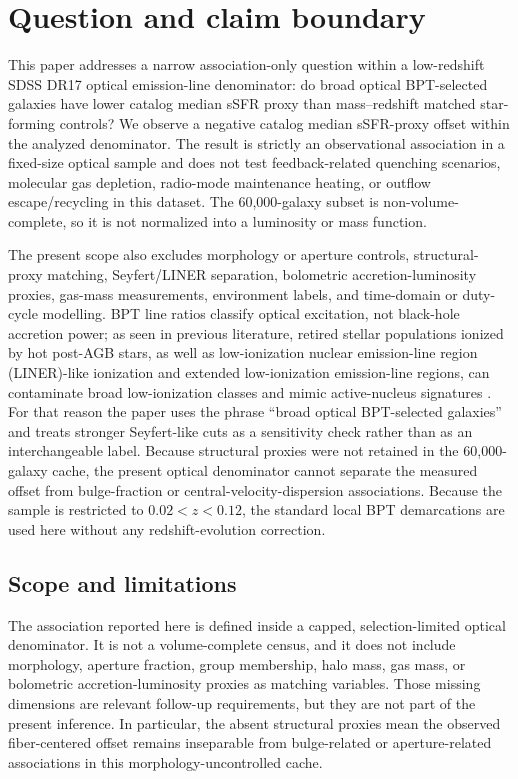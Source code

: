\documentclass[twocolumn]{aastex631}
\begin{document}

\section{Question and claim boundary}
This paper addresses a narrow association-only question within a low-redshift SDSS DR17 optical emission-line denominator: do broad optical BPT-selected galaxies have lower catalog median sSFR proxy than mass--redshift matched star-forming controls? We observe a negative catalog median sSFR-proxy offset within the analyzed denominator. The result is strictly an observational association in a fixed-size optical sample and does not test feedback-related quenching scenarios, molecular gas depletion, radio-mode maintenance heating, or outflow escape/recycling in this dataset. The 60,000-galaxy subset is non-volume-complete, so it is not normalized into a luminosity or mass function.


The present scope also excludes morphology or aperture controls, structural-proxy matching, Seyfert/LINER separation, bolometric accretion-luminosity proxies, gas-mass measurements, environment labels, and time-domain or duty-cycle modelling. BPT line ratios classify optical excitation, not black-hole accretion power; as seen in previous literature, retired stellar populations ionized by hot post-AGB stars, as well as low-ionization nuclear emission-line region (LINER)-like ionization and extended low-ionization emission-line regions, can contaminate broad low-ionization classes and mimic active-nucleus signatures \citep{cidfernandes2011,stasinska2008,stasinska2015,belfiore2016}. For that reason the paper uses the phrase ``broad optical BPT-selected galaxies'' and treats stronger Seyfert-like cuts as a sensitivity check rather than as an interchangeable label. Because structural proxies were not retained in the 60,000-galaxy cache, the present optical denominator cannot separate the measured offset from bulge-fraction or central-velocity-dispersion associations. Because the sample is restricted to $0.02<z<0.12$, the standard local BPT demarcations are used here without any redshift-evolution correction.

\subsection{Scope and limitations}
The association reported here is defined inside a capped, selection-limited optical denominator. It is not a volume-complete census, and it does not include morphology, aperture fraction, group membership, halo mass, gas mass, or bolometric accretion-luminosity proxies as matching variables. Those missing dimensions are relevant follow-up requirements, but they are not part of the present inference. In particular, the absent structural proxies mean the observed fiber-centered offset remains inseparable from bulge-related or aperture-related associations in this morphology-uncontrolled cache.
\end{document}
